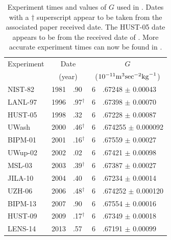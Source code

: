 \documentclass[page-classic]{epl2}
\begin{document}
\begin{table}
\caption{Experiment times and values of $G$ used in \cite{2015EL....11010002A}. Dates with a
$\dagger$ superscript appear to be taken from the associated paper received date. The HUST-05 date
appears to be from the received date of \cite{PhysRevD.59.042001}. More accurate experiment times
can now be found in \cite{2015arXiv150501774S}.}
\label{tab:Gs}
\begin{center}
 \begin{tabular}{llr@{}lr@{}l}
  \multicolumn{2}{l}{Experiment} & \multicolumn{2}{c}{Date} & \multicolumn{2}{c}{$G$} \\
  \multicolumn{2}{l}{~} & \multicolumn{2}{c}{(year)} & \multicolumn{2}{c}{($10^{-11} {\rm m}^3 {\rm sec}^{-2} {\rm kg}^{-1}$)} \\
\hline
NIST-82 &\cite{PhysRevLett.48.121} & 1981&.90 & 6&.67248 $\pm$ 0.00043 \\
LANL-97 &\cite{PhysRevLett.78.3047} & 1996&.97$^{\dagger}$ & 6&.67398 $\pm$ 0.00070 \\
HUST-05 &\cite{PhysRevD.71.127505} & 1998&.32 & 6&.67228 $\pm$ 0.00087 \\
UWash &\cite{PhysRevLett.85.2869} & 2000&.46$^{\dagger}$ & 6&.674255 $\pm$ 0.000092 \\
BIPM-01 &\cite{PhysRevLett.87.111101} & 2001&.16$^{\dagger}$ & 6&.67559 $\pm$ 0.00027 \\
UWup-02 &\cite{UWup} & 2002&.02 & 6&.67421 $\pm$ 0.00098 \\ 
MSL-03 &\cite{PhysRevLett.91.201101} & 2003&.39$^{\dagger}$ & 6&.67387 $\pm$ 0.00027 \\
JILA-10 &\cite{PhysRevLett.105.110801} & 2004&.40 & 6&.67234 $\pm$ 0.00014 \\
UZH-06 &\cite{PhysRevD.74.082001} & 2006&.48$^{\dagger}$ & 6&.674252 $\pm$ 0.000120 \\
BIPM-13 &\cite{PhysRevLett.111.101102,PhysRevLett.113.039901} & 2007&.90 & 6&.67554 $\pm$ 0.00016 \\
HUST-09 &\cite{PhysRevLett.102.240801} & 2009&.17$^{\dagger}$ & 6&.67349 $\pm$ 0.00018 \\
LENS-14 &\cite{2014Natur.510..518R} & 2013&.57 & 6&.67191 $\pm$ 0.00099
 \end{tabular}
\end{center}
\end{table}
\end{document}
